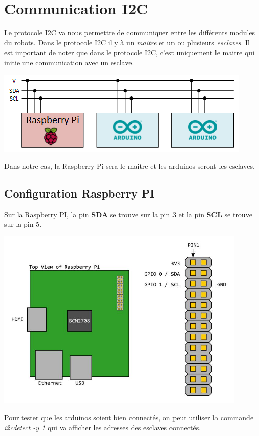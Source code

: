 \documentclass{eurobot_report}
\begin{document}
\chapter{Communication I2C}

Le protocole I2C va nous permettre de communiquer entre les différents modules du robots. Dans le protocole I2C il y à un \textit{maitre} et un ou plusieurs \textit{esclaves}. Il est important de noter que dans le protocole I2C, c'est uniquement le maitre qui initie une communication avec un esclave.

\includegraphics{assets/i2c.png}

Dans notre cas, la Raspberry Pi sera le maitre et les arduinos seront les esclaves.

\section{Configuration Raspberry PI}
Sur la Raspberry PI, la pin \textbf{SDA} se trouve sur la pin 3 et la pin \textbf{SCL} se trouve sur la pin 5.

\begin{center}
\includegraphics[width=12cm]{assets/rbp-i2c-pins}
\end{center}

Pour tester que les arduinos soient bien connectés, on peut utiliser la commande \textit{i2cdetect -y 1} qui va afficher les adresses des esclaves connectés.
\end{document}
